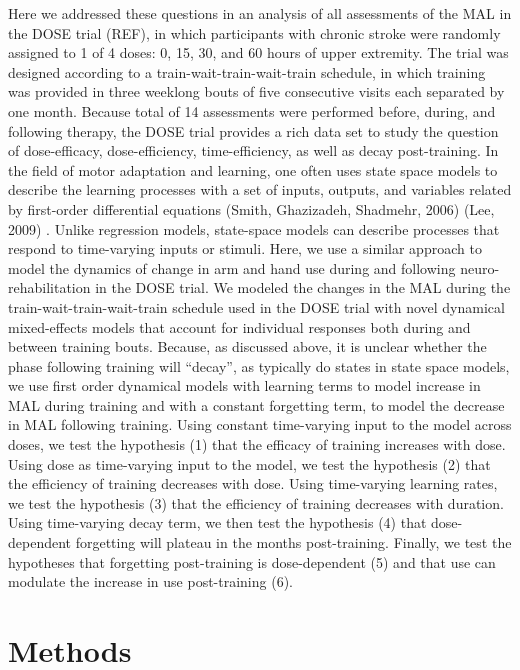 Here we addressed these questions in an analysis of all assessments of the MAL in the DOSE trial (REF), in which participants with chronic stroke were randomly assigned to 1 of 4 doses: 0, 15, 30, and 60 hours of upper extremity.
The trial was designed according to a train-wait-train-wait-train schedule, in which training was provided in three weeklong bouts of five consecutive visits each separated by one month. 
Because total of 14 assessments were performed before, during, and following therapy, the DOSE trial provides a rich data set to study the question of dose-efficacy, dose-efficiency, time-efficiency, as well as decay post-training. 
In the field of motor adaptation and learning, one often uses state space models to describe the learning processes with a set of inputs, outputs, and variables related by first-order differential equations (Smith, Ghazizadeh,  Shadmehr, 2006) (Lee, 2009) . 
Unlike regression models, state-space models can describe processes that respond to time-varying inputs or stimuli. 
Here, we use a similar approach to model the dynamics of change in arm and hand use during and following neuro-rehabilitation in the DOSE trial. 
We modeled the changes in the MAL during the train-wait-train-wait-train schedule used in the DOSE trial with novel dynamical mixed-effects models that account for individual responses both during and between training bouts. 
Because, as discussed above, it is unclear whether the phase following training will “decay”, as typically do states in state space models, we use first order dynamical models with learning terms to model increase in MAL during training and with a constant forgetting term, to model the decrease in MAL following training. 
Using constant time-varying input to the model across doses, we test the hypothesis (1) that the efficacy of training increases with dose. 
Using dose as time-varying input to the model, we test the hypothesis (2) that the efficiency of training decreases with dose. 
Using time-varying learning rates, we test the hypothesis (3) that the efficiency of training decreases with duration. 
Using time-varying decay term, we then test the hypothesis (4) that dose-dependent forgetting will plateau in the months post-training. 
Finally, we test the hypotheses that forgetting post-training is dose-dependent (5) and that use can modulate the increase in use post-training (6). 



\section{Methods}

